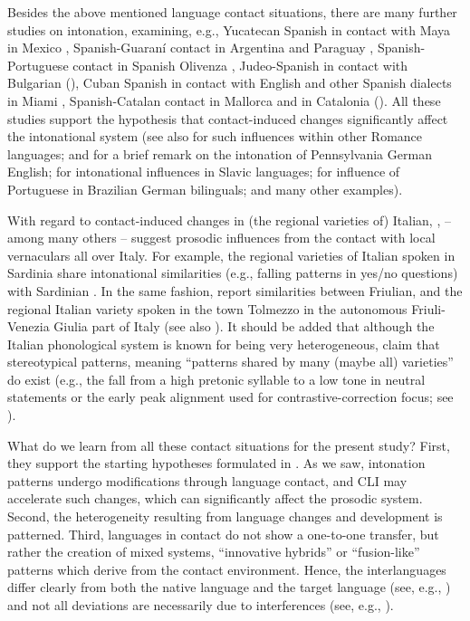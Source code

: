 Besides the above mentioned language contact situations, there are many further studies on intonation, examining, e.g., Yucatecan Spanish in contact with Maya in Mexico \citep{Uth2019}, Spanish-Guaraní contact in Argentina \citep{Colantoni2011} and Paraguay \citep{Pešková2022a}, Spanish-Portuguese contact in Spanish Olivenza \citep{Kireva2016}, Judeo-Spanish in contact with Bulgarian (\citealt{GabrielKireva2014b}), Cuban Spanish in contact with English and other Spanish dialects in Miami \citep{Alvord2006}, Spanish-Catalan contact in Mallorca \citep{Simonet2008} and in Catalonia (\citealt{GrünkeInProgress}). All these studies support the hypothesis that contact-induced changes significantly affect the intonational system (see also \citealt{FrotaPrieto2015} for such influences within other Romance languages; \citealt{Mencken1937} and \citealt{Romaine2001} for a brief remark on the intonation of Pennsylvania German English; \citealt{Grenoble2010} for intonational influences in Slavic languages; \citealt{Birkner2004} for influence of Portuguese in Brazilian German bilinguals; and many other examples).



With regard to contact-induced changes in (the regional varieties of) Italian, \citet{Cerruti2011},  \citet{GiliFivelaEtAl2015} -- among many others -- suggest prosodic influences from the contact with local vernaculars all over Italy. For example, the regional varieties of Italian spoken in Sardinia share intonational similarities (e.g., falling patterns in yes/no questions) with Sardinian \citep{VanrellEtAl2015}. In the same fashion,  \citet{RoseanoFernándezPlanas2019} report similarities between Friulian, and the regional Italian variety spoken in the town Tolmezzo in the autonomous Friuli-Venezia Giulia part of Italy (see also  \citealt{FernándezPlanasEtAl2017}). It should be added that although the Italian phonological system is known for being very heterogeneous,  \citet[196]{GiliFivelaEtAl2015} claim that stereotypical patterns, meaning “patterns shared by many (maybe all) varieties” do exist (e.g., the fall from a high pretonic syllable to a low tone in neutral statements or the early peak alignment used for contrastive-correction focus; see ).



What do we learn from all these contact situations for the present study? First, they support the starting hypotheses formulated in . As we saw, intonation patterns undergo modifications through language contact, and CLI may accelerate such changes, which can significantly affect the prosodic system. Second, the heterogeneity resulting from language changes and development is patterned. Third, languages in contact do not show a one-to-one transfer, but rather the creation of mixed systems, “innovative hybrids” \citep{Lipski2010} or “fusion-like” patterns \citep{Queen2001} which derive from the contact environment. Hence, the interlanguages differ clearly from both the native language and the target language (see, e.g., \citealt{Tarone1987}) and not all deviations are necessarily due to interferences (see, e.g., \citealt{KielhöferJonekeit2018}).



